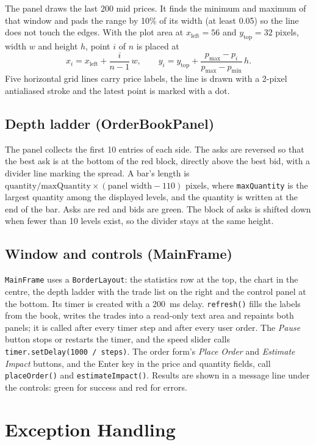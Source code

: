 \documentclass[12pt,a4paper,openany,oneside]{report}
\newcommand{\code}[1]{\texttt{#1}}
\begin{document}
The panel draws the last 200 mid prices. It finds the minimum and maximum of that window and pads the range by 10\% of its width (at least 0.05) so the line does not touch the edges. With the plot area at $x_\text{left}=56$ and $y_\text{top}=32$ pixels, width $w$ and height $h$, point $i$ of $n$ is placed at
\[
x_i = x_\text{left} + \frac{i}{n-1}\,w,\qquad
y_i = y_\text{top} + \frac{p_\text{max}-p_i}{p_\text{max}-p_\text{min}}\,h .
\]
Five horizontal grid lines carry price labels, the line is drawn with a 2-pixel antialiased stroke and the latest point is marked with a dot.

\subsection{Depth ladder (OrderBookPanel)}

The panel collects the first 10 entries of each side. The asks are reversed so that the best ask is at the bottom of the red block, directly above the best bid, with a divider line marking the spread. A bar's length is $\text{quantity}/\text{maxQuantity}\times(\text{panel width}-110)$ pixels, where \code{maxQuantity} is the largest quantity among the displayed levels, and the quantity is written at the end of the bar. Asks are red and bids are green. The block of asks is shifted down when fewer than 10 levels exist, so the divider stays at the same height.

\subsection{Window and controls (MainFrame)}

\code{MainFrame} uses a \code{BorderLayout}: the statistics row at the top, the chart in the centre, the depth ladder with the trade list on the right and the control panel at the bottom. Its timer is created with a 200~ms delay. \code{refresh()} fills the labels from the book, writes the trades into a read-only text area and repaints both panels; it is called after every timer step and after every user order. The \emph{Pause} button stops or restarts the timer, and the speed slider calls \code{timer.setDelay(1000 / steps)}. The order form's \emph{Place Order} and \emph{Estimate Impact} buttons, and the Enter key in the price and quantity fields, call \code{placeOrder()} and \code{estimateImpact()}. Results are shown in a message line under the controls: green for success and red for errors.

\section{Exception Handling}
\end{document}
